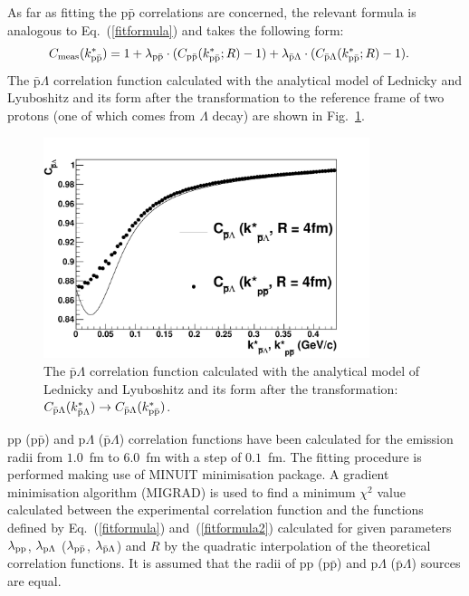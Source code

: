 As far as fitting the p$\bar{\mathrm{p}}$ correlations are concerned, the relevant formula is analogous to Eq.~(\ref{fitformula}) and takes the following form:
\begin{align}
  C_{\rm meas} (k^*_{\rm p\bar{p}}) &= 1 + \lambda_{\rm p\bar{p}} \cdot (C_{\rm p\bar{p}} (k^*_{\rm p\bar{p}};R) - 1)+ \lambda_{\rm \bar{p}\Lambda} \cdot(C_{\rm \bar{p}\Lambda} (k^*_{\rm p\bar{p}};R) - 1).
  \label{fitformula2}
\end{align}
The $\bar{\mathrm{p}}\Lambda$ correlation function calculated with the analytical model of Lednicky and Lyuboshitz and its form after the transformation to the reference frame of two protons (one of which comes from $\Lambda$ decay) are shown in Fig.~\ref{capla}.
\begin{figure}%
  \centering
  \includegraphics[width=0.85\textwidth]{capla}
  \caption{The $\bar{\mathrm{p}}\Lambda$ correlation function calculated with the analytical model of Lednicky and Lyuboshitz and its form after the transformation: $C_{\rm \bar{p}\Lambda}(k^*_{\rm \bar{p}\Lambda}) \rightarrow C_{\rm \bar{p}\Lambda}(k^*_{\rm p\bar{p}})$.}
  \label{capla}
\end{figure}

pp (p$\bar{\mathrm{p}}$) and p$\Lambda$ ($\bar{\mathrm{p}}\Lambda$) correlation functions have been calculated for the emission radii from $1.0$~fm to $6.0$~fm with a step of $0.1$~fm. The fitting procedure is performed making use of MINUIT minimisation package. A gradient minimisation algorithm (MIGRAD) is used to find a minimum $\chi^2$ value calculated between the experimental correlation function and the functions defined by Eq.~(\ref{fitformula}) and~(\ref{fitformula2}) calculated for given parameters $\lambda_{\rm pp}$, $\lambda_{\rm p\Lambda}$ ($\lambda_{\rm p\bar{p}}$, $\lambda_{\rm \bar{p}\Lambda}$) and $R$ by the quadratic interpolation of the theoretical correlation functions. It is assumed that the radii of pp (p$\bar{\mathrm{p}}$) and p$\Lambda$ ($\bar{\mathrm{p}}\Lambda$) sources are equal.

